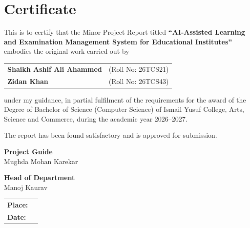 \chapter*{Certificate}

This is to certify that the Minor Project Report titled
\textbf{``AI-Assisted Learning and Examination Management System for
Educational Institutes''} embodies the original work carried out by

\begin{center}
\begin{tabular}{ll}
\textbf{Shaikh Ashif Ali Ahammed} & (Roll No: 26TCS21) \\
\textbf{Zidan Khan}                & (Roll No: 26TCS43) \\
\end{tabular}
\end{center}

under my guidance, in partial fulfilment of the requirements for the award
of the Degree of Bachelor of Science (Computer Science) of Ismail Yusuf
College, Arts, Science and Commerce, during the academic year 2026--2027.

The report has been found satisfactory and is approved for submission.

\vspace{2.4cm}

\begin{minipage}[t]{0.45\textwidth}
\textbf{Project Guide}\\[0.5em]
Mughda Mohan Karekar
\end{minipage}\hfill
\begin{minipage}[t]{0.45\textwidth}
\textbf{Head of Department}\\[0.5em]
Manoj Kaurav
\end{minipage}

\vspace{1.6cm}

\begin{tabular}{ll}
\textbf{Place:} & \\[0.4em]
\textbf{Date:}  & \\
\end{tabular}